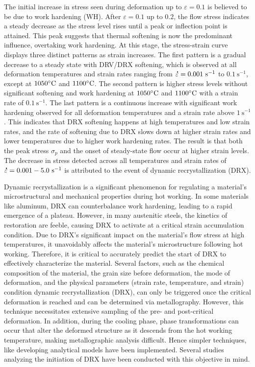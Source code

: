 \documentclass[metals,article,submit,pdftex,moreauthors]{Definitions/mdpi}
\DeclareRobustCommand{\mdot}[1]{\accentset{\mbox{\bfseries .}}{#1}}
\DeclareRobustCommand{\ps}{\text{s}^{-1}}
\begin{document}
The initial increase in stress seen during deformation up to $\varepsilon=0.1$ is believed to be due to work hardening (WH).
After $\varepsilon=0.1$ up to $0.2$, the flow stress indicates a steady decrease as the stress level rises until a peak or inflection point is attained.
This peak suggests that thermal softening is now the predominant influence, overtaking work hardening.
At this stage, the stress-strain curve displays three distinct patterns as strain increases.
The first pattern is a gradual decrease to a steady state with DRV/DRX softening, which is observed at all deformation temperatures and strain rates ranging from $\mdot\varepsilon=0.001~\ps$ to $0.1~\ps$, except at $1050\celsius$ and $1100\celsius$.
The second pattern is higher stress levels without significant softening and work hardening at $1050\celsius$ and $1100\celsius$ with a strain rate of $0.1~\ps$.
The last pattern is a continuous increase with significant work hardening observed for all deformation temperatures and a strain rate above $1~\ps$.
This indicates that DRX softening happens at high temperatures and low strain rates,
and the rate of softening due to DRX slows down at higher strain rates and lower temperatures due to higher work hardening rates.
The result is that both the peak stress $\sigma_p$ and the onset of steady-state flow occur at higher strain levels.
The decrease in stress detected across all temperatures and strain rates of $\mdot\varepsilon=0.001-5.0~\ps$ is attributed to the event of dynamic recrystallization (DRX).

Dynamic recrystallization is a significant phenomenon for regulating a material's microstructural and mechanical properties during hot working.
In some materials like aluminum, DRX can counterbalance work hardening, leading to a rapid emergence of a plateau.
However, in many austenitic steels, the kinetics of restoration are feeble, causing DRX to activate at a critical strain accumulation condition.
Due to DRX's significant impact on the material's flow stress at high temperatures, it unavoidably affects the material's microstructure following hot working.
Therefore, it is critical to accurately predict the start of DRX to effectively characterize the material.
Several factors, such as the chemical composition of the material, the grain size before deformation, the mode of deformation, and the physical parameters (strain rate, temperature, and strain) condition dynamic recrystallization (DRX), can only be triggered once the critical deformation is reached and can be determined via metallography.
However, this technique necessitates extensive sampling of the pre- and post-critical deformation.
In addition, during the cooling phase, phase transformations can occur that alter the deformed structure as it descends from the hot working temperature, making metallographic analysis difficult.
Hence simpler techniques, like developing analytical models have been implemented.
Several studies analyzing the initiation of DRX have been conducted with this objective in mind.
\end{document}
